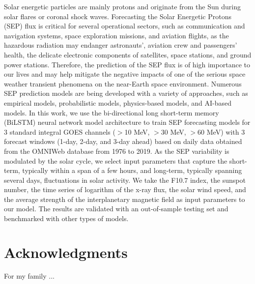 \documentclass[12pt, a4paper]{report}
\begin{document}
Solar energetic particles are mainly protons and originate from the Sun during solar flares or coronal shock waves. Forecasting the Solar Energetic Protons (SEP) flux is critical for several operational sectors, such as communication and navigation systems, space exploration missions, and aviation flights, as the hazardous radiation may endanger astronauts’, aviation crew and passengers’ health, the delicate electronic components of satellites, space stations, and ground power stations. Therefore, the prediction of the SEP flux is of high importance to our lives and may help mitigate the negative impacts of one of the serious space weather transient phenomena on the near-Earth space environment. Numerous SEP prediction models are being developed with a variety of approaches, such as empirical models, probabilistic models, physics-based models, and AI-based models. In this work, we use the bi-directional long short-term memory (BiLSTM) neural network model architecture to train SEP forecasting models for 3 standard integral GOES channels ($>$10 MeV, $>$30 MeV, $>$60 MeV) with 3 forecast windows (1-day, 2-day, and 3-day ahead) based on daily data obtained from the OMNIWeb database from 1976 to 2019. As the SEP variability is modulated by the solar cycle, we select input parameters that capture the short-term, typically within a span of a few hours, and long-term, typically spanning several days, fluctuations in solar activity. We take the F10.7 index, the sunspot number, the time series of logarithm of the x-ray flux, the solar wind speed, and the average strength of the interplanetary magnetic field as input parameters to our model. The results are validated with an out-of-sample testing set and benchmarked with other types of models.


\chapter*{Acknowledgments}
For my family ...

\tableofcontents
\listoftables
\listoffigures






\appendix


%

\end{document}
